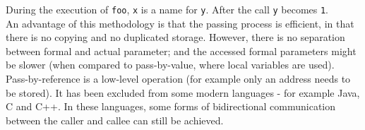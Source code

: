 During the execution of \verb|foo|, \verb|x| is a name for \verb|y|. After the call \verb|y| becomes \verb|1|. \\

An advantage of this methodology is that the passing process is efficient, in that there is no copying and no duplicated storage. However, there is no separation between formal and actual parameter; and the accessed formal parameters might be slower (when compared to pass-by-value, where local variables are used).\\

Pass-by-reference is a low-level operation (for example only an address needs to be stored). It has been excluded from some modern languages - for example Java, C and C++. In these languages, some forms of bidirectional communication between the caller and callee can still be achieved.